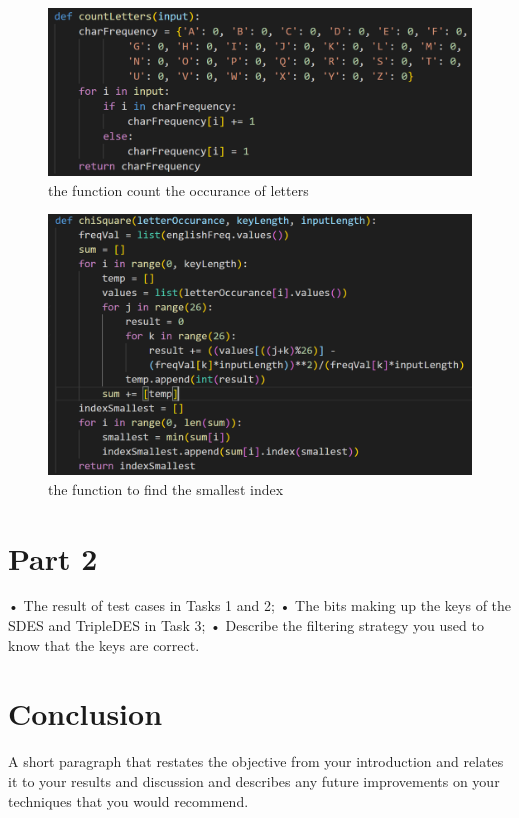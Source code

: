 \documentclass[12pt, letterpaper]{article}
\begin{document}
\begin{figure}
  \includegraphics[width=\linewidth]{code_snippets/countLetters.PNG}
  \caption{the function count the occurance of letters}
  \label{fig:countLetters}
\end{figure}

\begin{figure}
  \includegraphics[width=\linewidth]{code_snippets/chiSquare.PNG}
  \caption{the function to find the smallest index}
  \label{fig:chiSquare}
\end{figure}

\section*{Part 2}
• The result of test cases in Tasks 1 and 2; 
• The bits making up the keys of the SDES and TripleDES in Task 3; 
• Describe the filtering strategy you used to know that the keys are correct. 

\section*{Conclusion}
A short paragraph that restates the objective from your introduction and relates it to your results and discussion and describes any future improvements on your techniques that you would recommend. 
\end{document}

